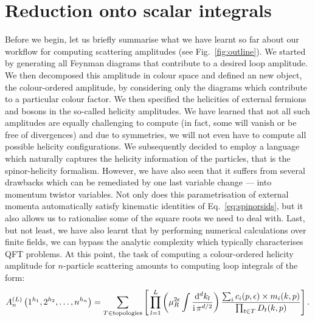 \documentclass[main.tex]{subfiles}
\begin{document}
\section{Reduction onto scalar integrals} \label{sec:reduction}
Before we begin, let us briefly summarise what we have learnt so far about our workflow for computing scattering amplitudes (see Fig.~\ref{fig:outline}). We started by generating all Feynman diagrams that contribute to a desired loop amplitude. We then decomposed this amplitude in colour space and defined an new object, the colour-ordered amplitude, by considering only the diagrams which contribute to a particular colour factor. We then specified the helicities of external fermions and bosons in the so-called helicity amplitudes. We have learned that not all such amplitudes are equally challenging to compute (in fact, some will vanish or be free of divergences) and due to symmetries, we will not even have to compute all possible helicity configurations. We subsequently decided to employ a language which naturally captures the helicity information of the particles, that is the spinor-helicity formalism. However, we have also seen that it suffers from several drawbacks which can be remediated by one last variable change --- into momentum twistor variables. Not only does this parametrisation of external momenta automatically satisfy kinematic identities of Eq.~\ref{eq:spinorsids}, but it also allows us to rationalise some of the square roots we need to deal with. Last, but not least, we have also learnt that by performing numerical calculations over finite fields, we can bypass the analytic complexity which typically characterises QFT problems.
At this point, the task of computing a colour-ordered helicity amplitude for $n$-particle scattering amounts to computing loop integrals of the form:
\begin{equation} \label{eq:ampschematic}
    	A_n^{(L)} \left(1^{h_1}, 2^{h_2}, \ldots, n^{h_n} \right) =  \sum_{T\in \text{topologies}} \left[\, \prod_{l=1}^{L} \left(\mu_R^{2\epsilon} \int \frac{\mathrm{d}^d k_l}{\mathrm{i} \, \pi^{d/2}}\right) \frac{\sum_i c_i(p, \epsilon )\times m_i(k,p)}{\prod_{t\in T} D_t(k,p)} \right].
\end{equation}
\end{document}
